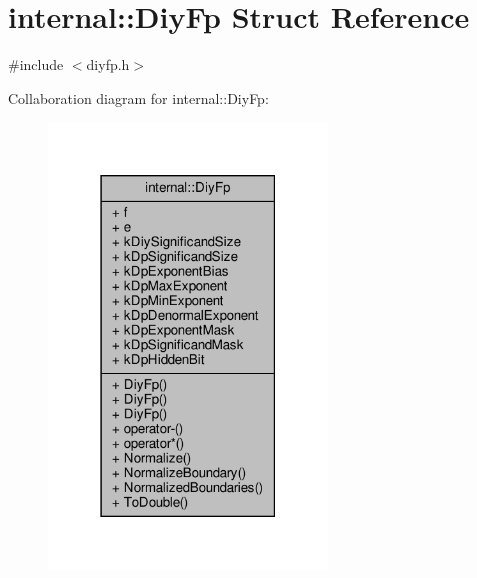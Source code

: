\hypertarget{structinternal_1_1DiyFp}{}\section{internal\+:\+:Diy\+Fp Struct Reference}
\label{structinternal_1_1DiyFp}


{\ttfamily \#include $<$diyfp.\+h$>$}



Collaboration diagram for internal\+:\+:Diy\+Fp\+:
\nopagebreak
\begin{figure}[H]
\begin{center}
\leavevmode
\includegraphics[width=210pt]{structinternal_1_1DiyFp__coll__graph}
\end{center}
\end{figure}
